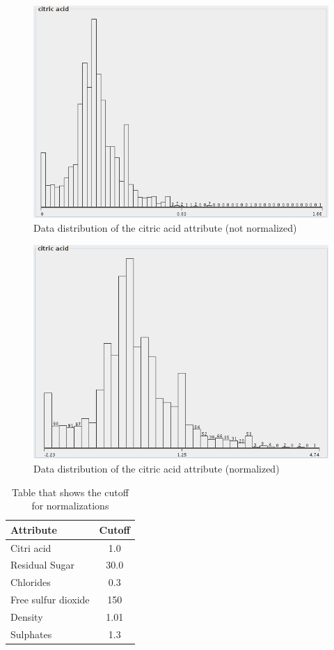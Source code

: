 \documentclass{acm_proc_article-sp}
\begin{document}
\begin{figure}
\centering
\includegraphics[width=0.6\linewidth]{img/dist-citric-acid}
\caption{Data distribution of the citric acid attribute (not normalized)}
\label{fig:dist-citric-acid}
\end{figure}

\begin{figure}
\centering
\includegraphics[width=0.6\linewidth]{img/ndist-citric-acid}
\caption{Data distribution of the citric acid attribute (normalized)}
\label{fig:ndist-citric-acid}
\end{figure}

\begin{table}
\centering
\begin{tabular}{l|c}
    Attribute & Cutoff \\
    \hline
    \hline
    Citri acid & 1.0 \\
    \hline
    Residual Sugar & 30.0 \\
    \hline
    Chlorides & 0.3 \\
    \hline
    Free sulfur dioxide & 150 \\
    \hline
    Density & 1.01 \\
    \hline
    Sulphates & 1.3 \\
\end{tabular}
\caption{Table that shows the cutoff for normalizations}
\label{tab:cutoff}
\end{table}
\end{document}
